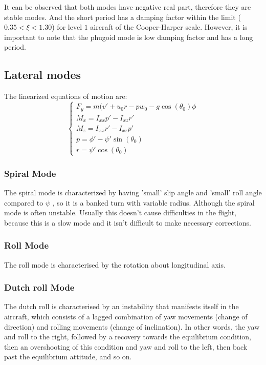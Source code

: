 \documentclass[english,fira]{ist-report}
\begin{document}
It can be observed that both modes have negative real part, therefore they are stable modes. And the short period has a damping factor within the limit ($0.35< \xi<1.30$) for level $1$ aircraft of the Cooper-Harper scale. However, it is important to note that the phugoid mode is low damping factor and has a long period.
 
\subsection{Lateral modes}
The linearized equations of motion are:
\begin{equation}
   \begin{cases} F_y = m(v' + u_0r -pw_0 -g\cos(\theta_0)\phi \\ M_x = I_{xx}p' -I_{xz}r'\\ M_z = I_{xx}r'-I_{xz}p'\\ p = \phi' - \psi'\sin(\theta_0) \\ r = \psi'\cos(\theta_0)\end{cases}
    \label{system of lateral equations} 
\end{equation}

\subsubsection{Spiral Mode}
The spiral mode is characterized by having 'small' slip angle and 'small' roll angle compared to $\psi$ , so it is a banked turn with variable radius. Although the spiral mode is often unstable. Usually this doesn't cause difficulties in the flight, because this is a slow mode and it isn't difficult to make necessary corrections.

\subsubsection{Roll Mode}
The roll mode is characterised by the rotation about longitudinal axis. 

\subsubsection{Dutch roll Mode}
The dutch roll is characterised by an instability that manifests itself in the aircraft, which consists of a lagged combination of yaw movements (change of direction) and rolling movements (change of inclination). In other words, the yaw and roll to the right, followed by a recovery towards the equilibrium condition, then an overshooting of this condition and yaw and roll to the left, then back past the equilibrium attitude, and so on.
\end{document}
